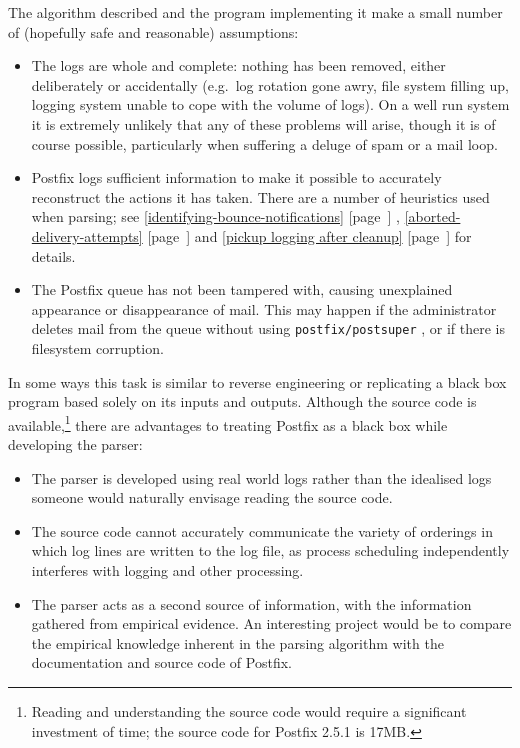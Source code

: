 \documentclass[a4paper,12pt,draft]{article}
\newcommand{\refwithpage}[1]{%
    \empty{}\ref{#1} [page~\pageref{#1}]%
}
\newcommand{\sectionref}[1]{%
    \textsection{}\refwithpage{#1}%
}
\newcommand{\daemon}[1]{%
    \texttt{postfix/#1}%
}
\begin{document}
The algorithm described and the program implementing it make a small number
of (hopefully safe and reasonable) assumptions:

\begin{itemize}

    \item The logs are whole and complete: nothing has been removed, either
        deliberately or accidentally (e.g.\ log rotation gone awry, file
        system filling up, logging system unable to cope with the volume of
        logs).  On a well run system it is extremely unlikely that any of
        these problems will arise, though it is of course possible,
        particularly when suffering a deluge of spam or a mail loop.

    \item Postfix logs sufficient information to make it possible to
        accurately reconstruct the actions it has taken.  There are a
        number of heuristics used when parsing; see
        \sectionref{identifying-bounce-notifications},
        \sectionref{aborted-delivery-attempts} and \sectionref{pickup
        logging after cleanup} for details.

    \item The Postfix queue has not been tampered with, causing unexplained
        appearance or disappearance of mail.  This may happen if the
        administrator deletes mail from the queue without using 
        \daemon{postsuper}, or if there is filesystem corruption.

\end{itemize}

In some ways this task is similar to reverse engineering or replicating a
black box program based solely on its inputs and outputs.  Although the
source code is available,\footnote{Reading and understanding the source
code would require a significant investment of time; the source code for
Postfix 2.5.1 is 17MB.} there are advantages to treating Postfix as a black
box while developing the parser:

\begin{itemize}

    \item The parser is developed using real world logs rather than the
        idealised logs someone would naturally envisage reading the source
        code.

    \item The source code cannot accurately communicate the variety of
        orderings in which log lines are written to the log file, as
        process scheduling independently interferes with logging and other
        processing.

    \item The parser acts as a second source of information, with the
        information gathered from empirical evidence.  An interesting
        project would be to compare the empirical knowledge inherent in the
        parsing algorithm with the documentation and source code of
        Postfix.

\end{itemize}
\end{document}

